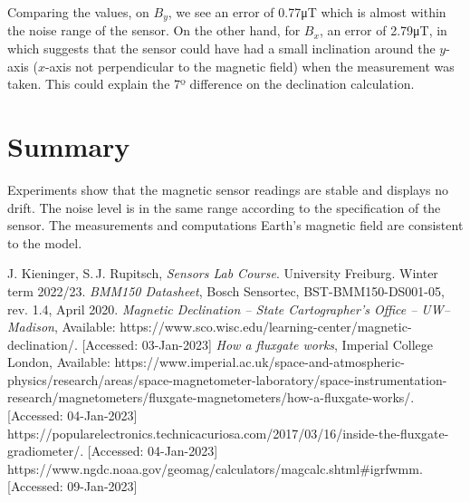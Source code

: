 \documentclass[DIV=14]{scrartcl}
\begin{document}
    Comparing the values, on $B_{y}$, we see an error of 0.77\si{\micro\tesla} which is almost within the noise range of the sensor.
    On the other hand, for $B_x$, an error of 2.79\si{\micro\tesla}, in which suggests that the sensor could have
    had a small inclination around the $y$-axis ($x$-axis not perpendicular to the magnetic field) when the measurement was taken.
    This could explain the 7º difference on the declination calculation.

    \section{Summary}
    Experiments show that the magnetic sensor readings are stable and displays no drift.
    The noise level is in the same range according to the specification of the sensor.
    The measurements and computations Earth's magnetic field are consistent to the model.



    \begin{thebibliography}{------}

         J. Kieninger, S.\,J. Rupitsch, \textit{Sensors Lab Course}.
        University Freiburg.
        Winter term 2022/23.
         \textit{BMM150 Datasheet}, Bosch Sensortec, BST-BMM150-DS001-05, rev. 1.4, April 2020.
         \textit{Magnetic Declination – State Cartographer's Office – UW–Madison},
        Available: https://www.sco.wisc.edu/learning-center/magnetic-declination/. [Accessed: 03-Jan-2023]
         \textit{How a fluxgate works}, Imperial College London,
        Available: https://www.imperial.ac.uk/space-and-atmospheric-physics/research/areas/space-magnetometer-laboratory/space-instrumentation-research/magnetometers/fluxgate-magnetometers/how-a-fluxgate-works/. [Accessed: 04-Jan-2023]
         https://popularelectronics.technicacuriosa.com/2017/03/16/inside-the-fluxgate-gradiometer/. [Accessed: 04-Jan-2023]
         https://www.ngdc.noaa.gov/geomag/calculators/magcalc.shtml#igrfwmm. [Accessed: 09-Jan-2023]
    \end{thebibliography}
\end{document}
